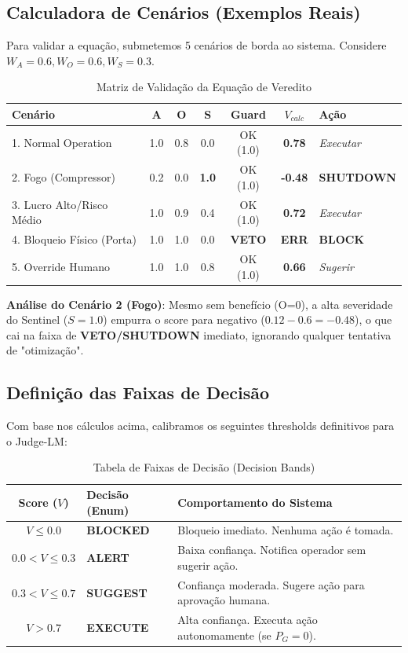 \documentclass[12pt, a4paper]{article}
\begin{document}
\subsection{Calculadora de Cenários (Exemplos Reais)}
Para validar a equação, submetemos 5 cenários de borda ao sistema. Considere $W_A=0.6, W_O=0.6, W_S=0.3$.

\begin{table}[h!]
\centering
\begin{tabular}{|l|c|c|c|c|c|l|}
\hline
\textbf{Cenário} & \textbf{A} & \textbf{O} & \textbf{S} & \textbf{Guard} & \textbf{$V_{calc}$} & \textbf{Ação} \\ \hline
1. Normal Operation & 1.0 & 0.8 & 0.0 & OK (1.0) & \textbf{0.78} & \textit{Executar} \\ \hline
2. Fogo (Compressor) & 0.2 & 0.0 & \textbf{1.0} & OK (1.0) & \textbf{-0.48} & \textbf{SHUTDOWN} \\ \hline
3. Lucro Alto/Risco Médio & 1.0 & 0.9 & 0.4 & OK (1.0) & \textbf{0.72} & \textit{Executar} \\ \hline
4. Bloqueio Físico (Porta) & 1.0 & 1.0 & 0.0 & \textbf{VETO} & \textbf{ERR} & \textbf{BLOCK} \\ \hline
5. Override Humano & 1.0 & 1.0 & 0.8 & OK (1.0) & \textbf{0.66} & \textit{Sugerir} \\ \hline
\end{tabular}
\caption{Matriz de Validação da Equação de Veredito}
\label{tab:calc_cenarios}
\end{table}

\noindent \textbf{Análise do Cenário 2 (Fogo)}:
Mesmo sem benefício (O=0), a alta severidade do Sentinel ($S=1.0$) empurra o score para negativo ($0.12 - 0.6 = -0.48$), o que cai na faixa de \textbf{VETO/SHUTDOWN} imediato, ignorando qualquer tentativa de "otimização".

\subsection{Definição das Faixas de Decisão}
Com base nos cálculos acima, calibramos os seguintes thresholds definitivos para o Judge-LM:

\begin{table}[h!]
\centering
\begin{tabular}{|c|l|l|}
\hline
\textbf{Score ($V$)} & \textbf{Decisão (Enum)} & \textbf{Comportamento do Sistema} \\ \hline
$V \leq 0.0$ & \textbf{BLOCKED} & Bloqueio imediato. Nenhuma ação é tomada. \\ \hline
$0.0 < V \leq 0.3$ & \textbf{ALERT} & Baixa confiança. Notifica operador sem sugerir ação. \\ \hline
$0.3 < V \leq 0.7$ & \textbf{SUGGEST} & Confiança moderada. Sugere ação para aprovação humana. \\ \hline
$V > 0.7$ & \textbf{EXECUTE} & Alta confiança. Executa ação autonomamente (se $P_G=0$). \\ \hline
\end{tabular}
\caption{Tabela de Faixas de Decisão (Decision Bands)}
\label{tab:decision_thresholds}
\end{table}
\end{document}
